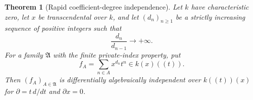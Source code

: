 \documentclass[11pt,letterpaper]{article}
\newtheorem{theorem}{Theorem}[section]
\theoremstyle{definition}
\theoremstyle{remark}
\numberwithin{equation}{section}
\begin{document}
\begin{theorem}[Rapid coefficient-degree independence]\label{isc:cp:thm:lacunary}
Let $k$ have characteristic zero, let $x$ be transcendental over $k$, and
let $(d_n)_{n\ge1}$ be a strictly increasing sequence of positive integers
such that
\begin{equation}\label{isc:cp:eq:fastgrowth}
 \frac{d_n}{d_{n-1}}\longrightarrow+\infty.
\end{equation}
For a family $\mathfrak A$ with the finite private-index property, put
\begin{equation}\label{isc:cp:eq:fA}
 f_A=\sum_{n\in A}x^{d_n}t^n\in k(x)((t)).
\end{equation}
Then $(f_A)_{A\in\mathfrak A}$ is differentially algebraically independent
over $k((t))(x)$ for $\partial=t\,d/dt$ and $\partial x=0$.
\end{theorem}
\end{document}
